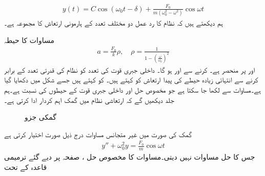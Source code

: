 \begin{align}\label{مساوات_سادہ_دو_بلا_تقصیر_حل_ب}
y(t)=C\cos(\omega_0 t-\delta)+\frac{F_0}{m(\omega_0^2-\omega^2)}\cos \omega t
\end{align}
ہم دیکھتے ہیں کہ نظام کا رد عمل دو مختلف تعدد کے ہارمونی ارتعاش کا مجموعہ ہے۔

مساوات  کا حیطہ
\begin{align}\label{مساوات_سادہ_دو_بلا_تقصیر_حل_پ}
a=\frac{F_0}{k} \rho, \quad \rho=\frac{1}{1-\left(\frac{\omega}{\omega_0}\right)^2}
\end{align}
 اور  پر منحصر ہے۔  کرنے سے  اور  ہو گا۔ داخلی جبری قوت کی تعدد کو نظام کی قدرتی تعدد کے برابر  کرنے سے انتہائی زیادہ حیطے کی پیدا ارتعاش  کو  کہتے ہیں۔  کو  کہتے ہیں جسے شکل  میں دکھایا گیا ہے۔مساوات  سے  لکھا جا سکتا ہے جو مخصوص حل  اور داخلی جبری قوت کے حیطوں کی نسبت ہے۔ہم جلد دیکھیں گے کہ ارتعاشی نظام میں گمک اہم کردار ادا کرتی ہے۔
\begin{figure}
\centering
{}
\caption{گمکی جزو }
\label{شکل_سادہ_دو_گمکی_جزو_بالمقابل_تعدد}
\end{figure}
گمک کی صورت میں غیر متجانس مساوات  درج ذیل صورت اختیار کرتی ہے
 \begin{align}\label{مساوات_سادہ_دو_بلا_تقصیر_حل_ت}
y''+\omega_0^2 y=\frac{F_0}{m} \cos \omega t
\end{align} 
جس کا حل مساوات  نہیں دیتی۔مساوات  کا مخصوص حل ،  صفحہ  پر دیے گئے ترمیمی قاعدہ کے تحت
